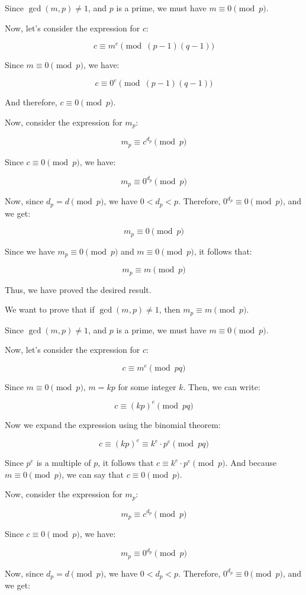 \documentclass{article}
\theoremstyle{definition}
\begin{document}
Since $\gcd(m, p) \neq 1$, and $p$ is a prime, we must have $m \equiv 0 \pmod p$.

Now, let's consider the expression for $c$:

$$c \equiv m^e \pmod{(p-1)(q-1)}$$

Since $m \equiv 0 \pmod p$, we have:

$$c \equiv 0^e \pmod{(p-1)(q-1)}$$

And therefore, $c \equiv 0 \pmod p$.

Now, consider the expression for $m_p$:

$$m_p \equiv c^{d_p} \pmod p$$

Since $c \equiv 0 \pmod p$, we have:

$$m_p \equiv 0^{d_p} \pmod p$$

Now, since $d_p = d \pmod p$, we have $0 < d_p < p$. Therefore, $0^{d_p} \equiv 0 \pmod p$, and we get:

$$m_p \equiv 0 \pmod p$$

Since we have $m_p \equiv 0 \pmod p$ and $m \equiv 0 \pmod p$, it follows that:

$$m_p \equiv m \pmod p$$

Thus, we have proved the desired result.

\newpage
We want to prove that if $\gcd(m, p) \neq 1$, then $m_p \equiv m \pmod{p}$.

Since $\gcd(m, p) \neq 1$, and $p$ is a prime, we must have $m \equiv 0 \pmod p$.

Now, let's consider the expression for $c$:

$$c \equiv m^e \pmod{pq}$$

Since $m \equiv 0 \pmod p$, $m = kp$ for some integer $k$. Then, we can write:

$$c \equiv (kp)^e \pmod{pq}$$

Now we expand the expression using the binomial theorem:

$$c \equiv (kp)^e \equiv k^e \cdot p^e \pmod{pq}$$

Since $p^e$ is a multiple of $p$, it follows that $c \equiv k^e \cdot p^e \pmod{p}$. And because $m \equiv 0 \pmod{p}$, we can say that $c \equiv 0 \pmod{p}$.

Now, consider the expression for $m_p$:

$$m_p \equiv c^{d_p} \pmod p$$

Since $c \equiv 0 \pmod p$, we have:

$$m_p \equiv 0^{d_p} \pmod p$$

Now, since $d_p = d \pmod p$, we have $0 < d_p < p$. Therefore, $0^{d_p} \equiv 0 \pmod p$, and we get:
\end{document}
